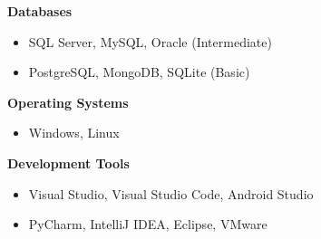 \documentclass[oneside]{article}
\begin{document}
{\begin{minipage}[t][\dimexpr\textheight-2\fboxrule-2\fboxsep\relax][t]{\dimexpr0.6\textwidth-2\fboxrule-2\fboxsep\relax}
        {\large \textbf{Databases}}
        \begin{itemize}
            \setlength{\itemsep}{-3pt}
            \item SQL Server, MySQL, Oracle (Intermediate)
            \item PostgreSQL, MongoDB, SQLite (Basic)
        \end{itemize}
        
        {\large \textbf{Operating Systems}}
        \begin{itemize}
            \setlength{\itemsep}{-3pt}
            \item Windows, Linux
        \end{itemize}
        
        {\large \textbf{Development Tools}}
        \begin{itemize}
            \setlength{\itemsep}{-3pt}
            \item Visual Studio, Visual Studio Code, Android Studio
            \item PyCharm, IntelliJ IDEA, Eclipse, VMware
        \end{itemize}

\end{minipage}}
\end{document}
